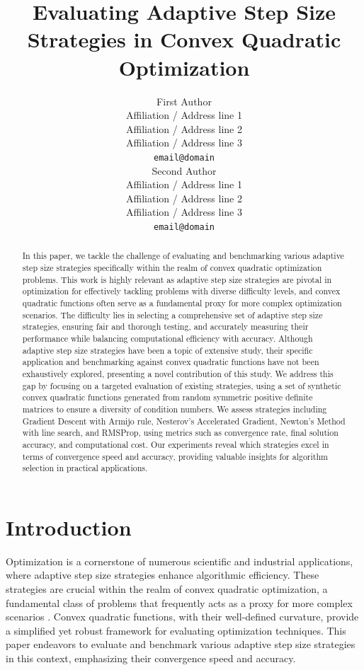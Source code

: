 \documentclass[11pt]{article}
\title{Evaluating Adaptive Step Size Strategies in Convex Quadratic Optimization}
\author{First Author \\
  Affiliation / Address line 1 \\
  Affiliation / Address line 2 \\
  Affiliation / Address line 3 \\
  \texttt{email@domain} \\\And
  Second Author \\
  Affiliation / Address line 1 \\
  Affiliation / Address line 2 \\
  Affiliation / Address line 3 \\
  \texttt{email@domain} \\}
\begin{document}
\maketitle
\begin{abstract}
In this paper, we tackle the challenge of evaluating and benchmarking various adaptive step size strategies specifically within the realm of convex quadratic optimization problems. This work is highly relevant as adaptive step size strategies are pivotal in optimization for effectively tackling problems with diverse difficulty levels, and convex quadratic functions often serve as a fundamental proxy for more complex optimization scenarios. The difficulty lies in selecting a comprehensive set of adaptive step size strategies, ensuring fair and thorough testing, and accurately measuring their performance while balancing computational efficiency with accuracy. Although adaptive step size strategies have been a topic of extensive study, their specific application and benchmarking against convex quadratic functions have not been exhaustively explored, presenting a novel contribution of this study. We address this gap by focusing on a targeted evaluation of existing strategies, using a set of synthetic convex quadratic functions generated from random symmetric positive definite matrices to ensure a diversity of condition numbers. We assess strategies including Gradient Descent with Armijo rule, Nesterov's Accelerated Gradient, Newton's Method with line search, and RMSProp, using metrics such as convergence rate, final solution accuracy, and computational cost. Our experiments reveal which strategies excel in terms of convergence speed and accuracy, providing valuable insights for algorithm selection in practical applications.
\end{abstract}


\section{Introduction}

Optimization is a cornerstone of numerous scientific and industrial applications, where adaptive step size strategies enhance algorithmic efficiency. These strategies are crucial within the realm of convex quadratic optimization, a fundamental class of problems that frequently acts as a proxy for more complex scenarios . Convex quadratic functions, with their well-defined curvature, provide a simplified yet robust framework for evaluating optimization techniques. This paper endeavors to evaluate and benchmark various adaptive step size strategies in this context, emphasizing their convergence speed and accuracy.
\end{document}
